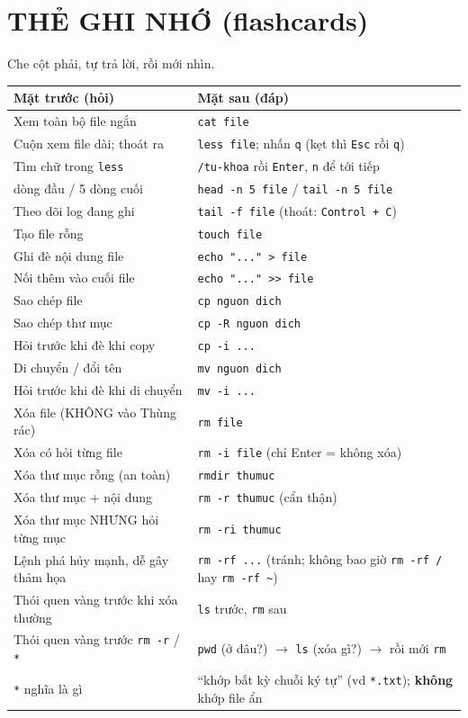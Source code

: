 \documentclass[12pt,a4paper]{article}
\newcommand{\cmd}[1]{\texttt{#1}}
\begin{document}
\section{THẺ GHI NHỚ (flashcards)}

Che cột phải, tự trả lời, rồi mới nhìn.

\renewcommand{\arraystretch}{1.3}
\begin{longtable}{>{\raggedright\arraybackslash}p{6.5cm} >{\raggedright\arraybackslash}p{8cm}}
\rowcolor{labgreenbg}
\textbf{Mặt trước (hỏi)} & \textbf{Mặt sau (đáp)} \\
\hline
\endhead
Xem toàn bộ file ngắn & \cmd{cat file} \\
Cuộn xem file dài; thoát ra & \cmd{less file}; nhấn \cmd{q} (kẹt thì \cmd{Esc} rồi \cmd{q}) \\
Tìm chữ trong \cmd{less} & \cmd{/tu-khoa} rồi \cmd{Enter}, \cmd{n} để tới tiếp \\
5 dòng đầu / 5 dòng cuối & \cmd{head -n 5 file} / \cmd{tail -n 5 file} \\
Theo dõi log đang ghi & \cmd{tail -f file} (thoát: \cmd{Control + C}) \\
Tạo file rỗng & \cmd{touch file} \\
Ghi đè nội dung file & \cmd{echo "..." > file} \\
Nối thêm vào cuối file & \cmd{echo "..." >> file} \\
Sao chép file & \cmd{cp nguon dich} \\
Sao chép thư mục & \cmd{cp -R nguon dich} \\
Hỏi trước khi đè khi copy & \cmd{cp -i ...} \\
Di chuyển / đổi tên & \cmd{mv nguon dich} \\
Hỏi trước khi đè khi di chuyển & \cmd{mv -i ...} \\
Xóa file (KHÔNG vào Thùng rác) & \cmd{rm file} \\
Xóa có hỏi từng file & \cmd{rm -i file} (chỉ Enter = không xóa) \\
Xóa thư mục rỗng (an toàn) & \cmd{rmdir thumuc} \\
Xóa thư mục + nội dung & \cmd{rm -r thumuc} (cẩn thận) \\
Xóa thư mục NHƯNG hỏi từng mục & \cmd{rm -ri thumuc} \\
Lệnh phá hủy mạnh, dễ gây thảm họa & \cmd{rm -rf ...} (tránh; không bao giờ \cmd{rm -rf /} hay \cmd{rm -rf \textasciitilde{}}) \\
Thói quen vàng trước khi xóa thường & \cmd{ls} trước, \cmd{rm} sau \\
Thói quen vàng trước \cmd{rm -r} / \cmd{*} & \cmd{pwd} (ở đâu?) $\rightarrow$ \cmd{ls} (xóa gì?) $\rightarrow$ rồi mới \cmd{rm} \\
\cmd{*} nghĩa là gì & ``khớp bất kỳ chuỗi ký tự'' (vd \cmd{*.txt}); \textbf{không} khớp file ẩn \\
\end{longtable}
\end{document}
